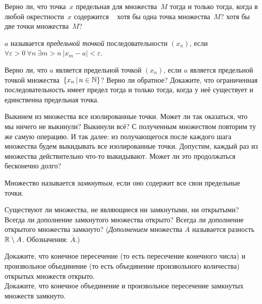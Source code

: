 \documentclass[a4paper, 11pt]{article}
\begin{document}

Верно ли, что точка~$x$ предельная для множества~$M$ тогда и только
тогда, когда в любой окрестности~$x$ содержится \
хотя бы одна
точка множества~$M$?
\пункт
хотя бы две точки множества~$M$?

$a$ называется {\itshape предельной точкой}
последовательности $(x_n)$, если
$\forall\varepsilon>0\ \forall n\ \exists m>n\ |x_m-a|<\varepsilon$.
\копр

Верно ли, что $a$ является предельной точкой
$(x_n)$, если %
$a$ является предельной точкой множества~$\{x_n\,|\,n\in\mathbb{N}\}$?
Верно ли обратное?
Докажите, что ограниченная
последовательность имеет предел тогда и только тогда,
когда у неё существует и единственна предельная точка.

Выкинем из множества все изолированные точки. Может ли так
оказаться, что мы ничего не выкинули? Выкинули всё?
С полученным множеством повторим ту же самую операцию.
И так далее: из получающегося
после каждого шага множества будем выкидывать все изолированные точки.
Допустим, каждый раз
из множества действительно что-то выкидывают. Может ли это
продолжаться бесконечно долго?

Множество называется {\itshape замкнутым}, если оно содержит
все свои предельные точки.

Существуют ли множества, не являющиеся ни замкнутыми, ни открытыми?\\
\пункт
Всегда ли дополнение замкнутого множества открыто?
Всегда ли дополнение открытого множества замкнуто?
({\itshape Дополнением} множества $A$ называется разность
$\mathbb{R}\setminus A$. Обозначения: $\overline{A}$.)

 Докажите, что конечное пересечение
(то есть пересечение конечного числа) и произвольное объединение
(то есть объединение произвольного количества)
открытых множеств открыто.\\
 Докажите, что конечное объединение
и произвольное пересечение замкнутых множеств замкнуто.
\end{document}
